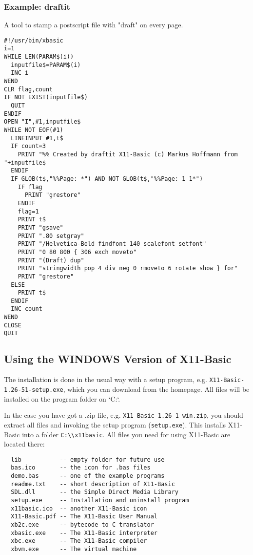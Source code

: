 \begin{mdframed}[hidealllines=true,backgroundcolor=blue!20]
\subsubsection*{Example: draftit} A tool to stamp a postscript file
with "draft" on every page.
{\footnotesize
\begin{verbatim}
#!/usr/bin/xbasic
i=1
WHILE LEN(PARAM$(i))
  inputfile$=PARAM$(i)
  INC i
WEND
CLR flag,count
IF NOT EXIST(inputfile$)
  QUIT
ENDIF  
OPEN "I",#1,inputfile$
WHILE NOT EOF(#1)
  LINEINPUT #1,t$
  IF count=3
    PRINT "%% Created by draftit X11-Basic (c) Markus Hoffmann from "+inputfile$
  ENDIF
  IF GLOB(t$,"%%Page: *") AND NOT GLOB(t$,"%%Page: 1 1*")
    IF flag
      PRINT "grestore"
    ENDIF
    flag=1
    PRINT t$
    PRINT "gsave"
    PRINT ".80 setgray"
    PRINT "/Helvetica-Bold findfont 140 scalefont setfont"
    PRINT "0 80 800 { 306 exch moveto"
    PRINT "(Draft) dup"
    PRINT "stringwidth pop 4 div neg 0 rmoveto 6 rotate show } for"
    PRINT "grestore"
  ELSE 
    PRINT t$
  ENDIF
  INC count
WEND
CLOSE
QUIT
\end{verbatim}
}
\end{mdframed}

\subsection{Using the WINDOWS Version of X11-Basic}

The installation is done in the usual way with a setup program, e.g.
\verb|X11-Basic-1.26-51-setup.exe|, which you can download from the homepage.
All files will be installed on the program folder on `C:`.

In the case you have got a .zip file, e.g. \verb|X11-Basic-1.26-1-win.zip|, 
you should extract all files and invoking the setup program (\verb|setup.exe|). 
This installs X11-Basic into a folder  \verb|C:\\x11basic|.  
All files you need for
using X11-Basic are located there:

\begin{verbatim}
  lib           -- empty folder for future use
  bas.ico       -- the icon for .bas files
  demo.bas      -- one of the example programs
  readme.txt    -- short description of X11-Basic
  SDL.dll       -- the Simple Direct Media Library
  setup.exe     -- Installation and uninstall program
  x11basic.ico  -- another X11-Basic icon
  X11-Basic.pdf -- The X11-Basic User Manual
  xb2c.exe      -- bytecode to C translator
  xbasic.exe    -- The X11-Basic interpreter
  xbc.exe       -- The X11-Basic compiler
  xbvm.exe      -- The virtual machine
\end{verbatim}

